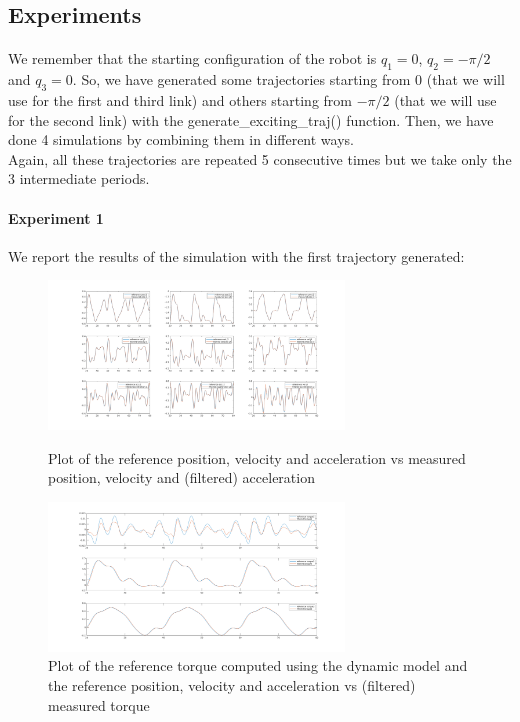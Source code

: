 \documentclass{article}
\begin{document}
\subsection{Experiments}
\paragraph{}We remember that the starting configuration of the robot is $q_1 = 0$, $q_2 = -\pi/2$ and $q_3 = 0$. So, we have generated some trajectories starting from 0 (that we will use for the first and third link) and others starting from $-\pi/2$ (that we will use for the second link) with the generate\_exciting\_traj() function. Then, we have done 4 simulations by combining them in different ways.\\ Again, all these trajectories are repeated 5 consecutive times but we take only the 3 intermediate periods.

\paragraph{Experiment 1}
We report the results of the simulation with the first trajectory generated:
\begin{figure}[!htbp]
\centering
\includegraphics[width=0.7\textwidth]{images/3-dof/experiment1_traj.png}
\caption{Plot of the reference position, velocity and acceleration vs measured position, velocity and (filtered) acceleration}
\includegraphics[width=0.7\textwidth]{images/3-dof/experiment1.png}
\caption{Plot of the reference torque computed using the dynamic model and the reference position, velocity and acceleration vs (filtered) measured torque}
\end{figure}
\pagebreak
\end{document}
